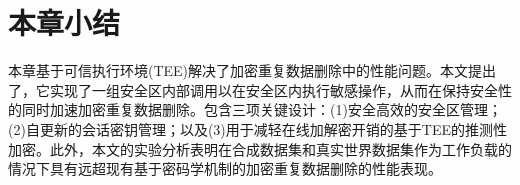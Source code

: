 \section{本章小结}
\label{sec:sgxdedup-sgxdedup-conclusion}

本章基于可信执行环境(TEE)解决了加密重复数据删除中的性能问题。本文提出了\sysnameS，它实现了一组安全区内部调用以在安全区内执行敏感操作，从而在保持安全性的同时加速加密重复数据删除。\sysnameS 包含三项关键设计：(1)安全高效的安全区管理；(2)自更新的会话密钥管理；以及(3)用于减轻在线加解密开销的基于TEE的推测性加密。此外，本文的实验分析表明\sysnameS 在合成数据集和真实世界数据集作为工作负载的情况下具有远超现有基于密码学机制的加密重复数据删除的性能表现。
